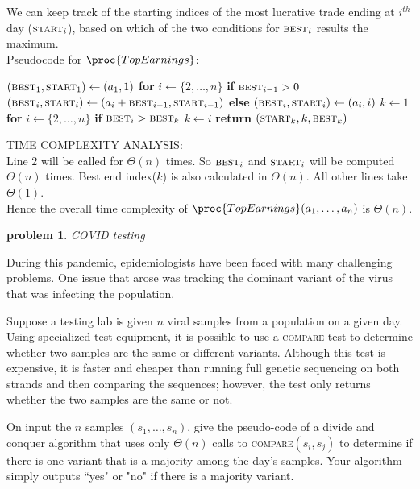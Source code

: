 \documentclass[11pt]{article}
\newtheorem{problem}{\sc\color{cit}problem}
\begin{document}
\begin{enumerate}
    We can keep track of the starting indices of the most lucrative trade ending at $i^{th}$ day ($\textsc{start}_i$), based on which of the two conditions for $\textsc{best}_i$ results the maximum.\\
    \newpage
    Pseudocode for $\proc{TopEarnings}$:
    \begin{codebox}
    \li $(\textsc{best}_1, \textsc{start}_1) \leftarrow (a_1,1)$
    \li \textbf{for} $i \leftarrow \{2, \ldots, n\}$
    \li \quad \textbf{if} $\textsc{best}_{i-1} > 0$
    \li \quad \quad $(\textsc{best}_i, \textsc{start}_i)  \leftarrow (a_i + \textsc{best}_{i-1}, \textsc{start}_{i-1})$ 
    \li \quad \textbf{else}
    \li \quad \quad $(\textsc{best}_i, \textsc{start}_i)  \leftarrow (a_i, i)$
    \li $k\leftarrow 1$
    \li \textbf{for} $i \leftarrow \{2, \ldots, n\}$
    \li \quad \textbf{if} $\textsc{best}_{i} > \textsc{best}_{k}$
    \li \quad \quad $k \leftarrow i$
    \li \textbf{return} $(\textsc{start}_k, k, \textsc{best}_k)$
    \end{codebox}
    
    TIME COMPLEXITY ANALYSIS:\\
    Line $2$ will be called for $\Theta(n)$ times. So $\textsc{best}_i$ and $\textsc{start}_i$ will be computed $\Theta(n)$ times. Best end index($k$) is also calculated in $\Theta(n)$. All other lines take $\Theta(1)$.\\
    Hence the overall time complexity of $\proc{TopEarnings}(a_1,\ldots,a_n)$ is $\Theta(n)$.
    \end{enumerate}

\newpage    

\begin{problem}{COVID testing}\end{problem}
During this pandemic, epidemiologists have been faced with many challenging problems.  One issue that arose was tracking the dominant variant of the virus that was infecting the population.

Suppose a testing lab is given $n$ viral samples from a population on a given day.  Using specialized test equipment, it is possible to use a \textsc{compare} test to determine whether two samples are the same or different variants.  Although this test is expensive, it is faster and cheaper than running full genetic sequencing on both strands and then comparing the sequences; however, the test only returns whether the two samples are the same or not.

On input the $n$ samples $(s_1,\ldots,s_n)$, give the pseudo-code of a divide and conquer algorithm that uses only $\Theta(n)$ calls to \textsc{compare}$(s_i,s_j)$  to determine if there is one variant that is a majority among the day's samples.  Your algorithm simply outputs ``yes" or "no" if there is a majority variant.
\end{document}
